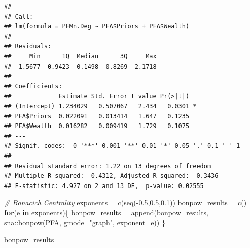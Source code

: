 \documentclass[
  notitlepage,
  onecolumn,
  openany]{book}
\newenvironment{Shaded}{\begin{snugshade}}{\end{snugshade}}
\newcommand{\AttributeTok}[1]{\textcolor[rgb]{0.77,0.63,0.00}{#1}}
\newcommand{\CommentTok}[1]{\textcolor[rgb]{0.56,0.35,0.01}{\textit{#1}}}
\newcommand{\ControlFlowTok}[1]{\textcolor[rgb]{0.13,0.29,0.53}{\textbf{#1}}}
\newcommand{\DocumentationTok}[1]{\textcolor[rgb]{0.56,0.35,0.01}{\textbf{\textit{#1}}}}
\newcommand{\FloatTok}[1]{\textcolor[rgb]{0.00,0.00,0.81}{#1}}
\newcommand{\FunctionTok}[1]{\textcolor[rgb]{0.00,0.00,0.00}{#1}}
\newcommand{\NormalTok}[1]{#1}
\newcommand{\OtherTok}[1]{\textcolor[rgb]{0.56,0.35,0.01}{#1}}
\newcommand{\SpecialCharTok}[1]{\textcolor[rgb]{0.00,0.00,0.00}{#1}}
\newcommand{\StringTok}[1]{\textcolor[rgb]{0.31,0.60,0.02}{#1}}
\begin{document}
\begin{Shaded}
\end{Shaded}

\begin{verbatim}
## 
## Call:
## lm(formula = PFMn.Deg ~ PFA$Priors + PFA$Wealth)
## 
## Residuals:
##     Min      1Q  Median      3Q     Max 
## -1.5677 -0.9423 -0.1498  0.8269  2.1718 
## 
## Coefficients:
##             Estimate Std. Error t value Pr(>|t|)  
## (Intercept) 1.234029   0.507067   2.434   0.0301 *
## PFA$Priors  0.022091   0.013414   1.647   0.1235  
## PFA$Wealth  0.016282   0.009419   1.729   0.1075  
## ---
## Signif. codes:  0 '***' 0.001 '**' 0.01 '*' 0.05 '.' 0.1 ' ' 1
## 
## Residual standard error: 1.22 on 13 degrees of freedom
## Multiple R-squared:  0.4312, Adjusted R-squared:  0.3436 
## F-statistic: 4.927 on 2 and 13 DF,  p-value: 0.02555
\end{verbatim}

\begin{Shaded}
\begin{Highlighting}[]
\CommentTok{\# Bonacich Centrality}
\NormalTok{exponents }\OtherTok{=} \FunctionTok{c}\NormalTok{(}\FunctionTok{seq}\NormalTok{(}\SpecialCharTok{{-}}\FloatTok{0.5}\NormalTok{,}\FloatTok{0.5}\NormalTok{,}\FloatTok{0.1}\NormalTok{))}
\NormalTok{bonpow\_results }\OtherTok{=} \FunctionTok{c}\NormalTok{()}
\ControlFlowTok{for}\NormalTok{(e }\ControlFlowTok{in}\NormalTok{ exponents)\{}
\NormalTok{   bonpow\_results }\OtherTok{=} \FunctionTok{append}\NormalTok{(bonpow\_results,}
\NormalTok{                           sna}\SpecialCharTok{::}\FunctionTok{bonpow}\NormalTok{(PFA, }\AttributeTok{gmode=}\StringTok{"graph"}\NormalTok{, }\AttributeTok{exponent=}\NormalTok{e))}
\NormalTok{\}}

\NormalTok{bonpow\_results}
\end{Highlighting}
\end{Shaded}
\end{document}
